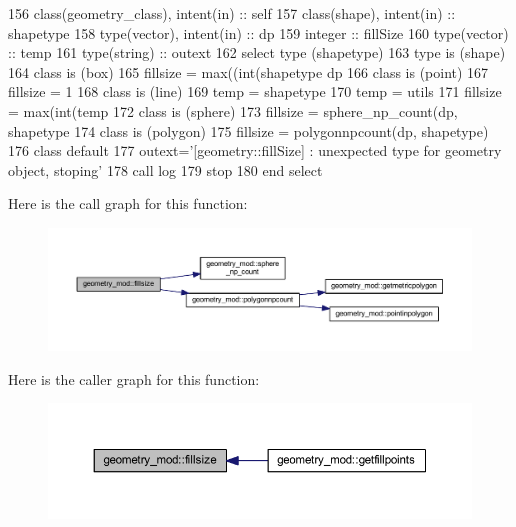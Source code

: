 \begin{DoxyCode}
156     \textcolor{keywordtype}{class}(geometry\_class), \textcolor{keywordtype}{intent(in)} :: self
157     \textcolor{keywordtype}{class}(shape), \textcolor{keywordtype}{intent(in)} :: shapetype
158     \textcolor{keywordtype}{type}(vector), \textcolor{keywordtype}{intent(in)} :: dp
159     \textcolor{keywordtype}{integer} :: fillSize
160     \textcolor{keywordtype}{type}(vector) :: temp
161     \textcolor{keywordtype}{type}(string) :: outext
162     \textcolor{keywordflow}{select type} (shapetype)
163 \textcolor{keywordflow}{    type is} (shape)
164 \textcolor{keywordflow}{    class is} (box)
165         fillsize = max((int(shapetype%
      dp%
166 \textcolor{keywordflow}{    class is} (point)
167         fillsize = 1
168 \textcolor{keywordflow}{    class is} (line)
169         temp = shapetype%
170         temp = utils%
171         fillsize = max(int(temp%
172 \textcolor{keywordflow}{    class is} (sphere)
173         fillsize = sphere\_np\_count(dp, shapetype%
174 \textcolor{keywordflow}{    class is} (polygon)
175         fillsize = polygonnpcount(dp, shapetype)
176 \textcolor{keywordflow}{        class default}
177         outext=\textcolor{stringliteral}{'[geometry::fillSize] : unexpected type for geometry object, stoping'}
178         \textcolor{keyword}{call }log%
179         stop
180 \textcolor{keywordflow}{    end select}
\end{DoxyCode}
Here is the call graph for this function\+:\nopagebreak
\begin{figure}[H]
\begin{center}
\leavevmode
\includegraphics[width=350pt]{namespacegeometry__mod_ad790edd694561b33dad20cfa3a14e8f2_cgraph}
\end{center}
\end{figure}
Here is the caller graph for this function\+:\nopagebreak
\begin{figure}[H]
\begin{center}
\leavevmode
\includegraphics[width=350pt]{namespacegeometry__mod_ad790edd694561b33dad20cfa3a14e8f2_icgraph}
\end{center}
\end{figure}
